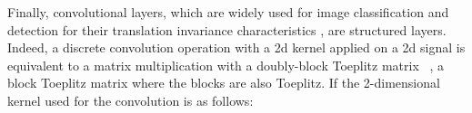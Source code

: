 {%
%





%


%
%


Finally, convolutional layers, which are widely used for image classification and detection for their translation invariance characteristics \cite{zhang1990parallel}, are structured layers.
Indeed, a discrete convolution operation with a 2d kernel applied on a 2d signal is equivalent to a matrix multiplication with a doubly-block Toeplitz matrix~\cite{jain1989fundamentals} \ie, a block Toeplitz matrix where the blocks are also Toeplitz.
If the 2-dimensional kernel used for the convolution is as follows:

}
